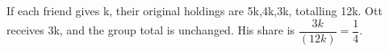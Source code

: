 If each friend gives k, their original holdings are 5k,4k,3k, totalling 12k. Ott receives 3k, and the group total is unchanged. His share is $\dfrac{3k}{(12k)}=\boxed{\dfrac{1}{4}}$.
